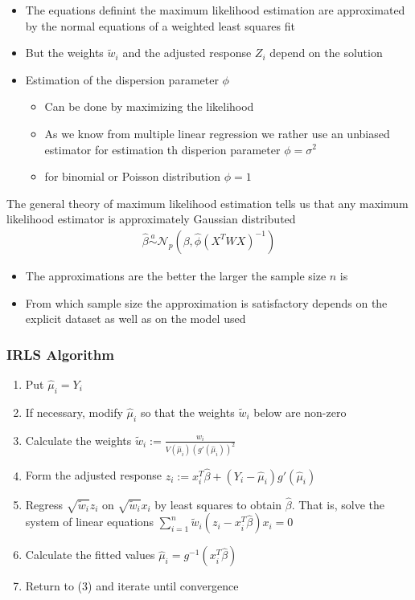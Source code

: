 \begin{itemize}
\item The equations definint the maximum likelihood estimation are
approximated by the normal equations of a weighted least squares fit
\item But the weights $\widetilde w_i$ and the adjusted response $Z_i$ depend
on
the solution
\item Estimation of the dispersion parameter $\phi$
\begin{itemize}
\item Can be done by maximizing the likelihood
\item As we know from multiple linear regression we rather use an unbiased
estimator for estimation th disperion parameter $\phi = \sigma^2$
\item for binomial or Poisson distribution $\phi = 1$
\end{itemize}
\end{itemize}

The general theory of maximum likelihood estimation tells us that any maximum
likelihood estimator is approximately Gaussian distributed
\begin{align*}
\widehat\beta
\stackrel{a}{\sim}
\mathcal{N}_p\left(\beta, \widehat\phi\left(X^T W X\right)^{-1}\right)
\end{align*}
\begin{itemize}
\item The approximations are the better the larger the sample size $n$ is
\item From which sample size the approximation is satisfactory depends on the
explicit dataset as well as on the model used
\end{itemize}

\subsubsection{IRLS Algorithm}
\begin{enumerate}
\item Put $\widehat\mu_i = Y_i$
\item If necessary, modify $\widehat\mu_i$ so that the weights $\widetilde w_i$
below
are non-zero
\item Calculate the weights
$\displaystyle \widetilde w_i := \frac{w_i}{V(\widehat\mu_i)
(g'(\widehat\mu_i))^2}$
\item Form the adjusted response
$\displaystyle z_i := x_i^T \widehat\beta + (Y_i - \widehat\mu_i)
g'(\widehat\mu_i)$
\item Regress $\sqrt{\widetilde w_i} z_i$ on $\sqrt{\widetilde w_i} x_i$
by least squares to obtain $\widehat\beta$.\newline
That is, solve the system of linear equations
$\displaystyle \sum_{i=1}^n \widetilde w_i (z_i - x_i^T \widehat\beta) x_i = 0$
\item Calculate the fitted values
$\widehat\mu_i = g^{-1}\left(x_i^T \widehat\beta \right)$
\item Return to (3) and iterate until convergence
\end{enumerate}

